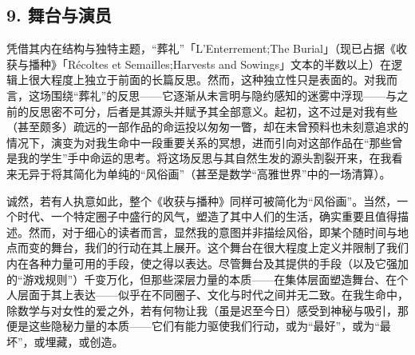 \subsection{9. 舞台与演员}

凭借其内在结构与独特主题，“葬礼”「L'Enterrement;The Burial」（现已占据《收获与播种》「Récoltes et Semailles;Harvests and Sowings」文本的半数以上）在逻辑上很大程度上独立于前面的长篇反思。然而，这种独立性只是表面的。对我而言，这场围绕“葬礼”的反思——它逐渐从未言明与隐约感知的迷雾中浮现——与之前的反思密不可分，后者是其源头并赋予其全部意义。起初，这不过是对我有些（甚至颇多）疏远的一部作品的命运投以匆匆一瞥，却在未曾预料也未刻意追求的情况下，演变为对我生命中一段重要关系的冥想，进而引向对这部作品在“那些曾是我的学生”手中命运的思考。将这场反思与其自然生发的源头割裂开来，在我看来无异于将其简化为单纯的“风俗画”（甚至是数学“高雅世界”中的一场清算）。

诚然，若有人执意如此，整个《收获与播种》同样可被简化为“风俗画”。当然，一个时代、一个特定圈子中盛行的风气，塑造了其中人们的生活，确实重要且值得描述。然而，对于细心的读者而言，显然我的意图并非描绘风俗，即某个随时间与地点而变的舞台，我们的行动在其上展开。这个舞台在很大程度上定义并限制了我们内在各种力量可用的手段，使之得以表达。尽管舞台及其提供的手段（以及它强加的“游戏规则”）千变万化，但那些深层力量的本质——在集体层面塑造舞台、在个人层面于其上表达——似乎在不同圈子、文化与时代之间并无二致。在我生命中，除数学与对女性的爱之外，若有何物让我（虽是迟至今日）感受到神秘与吸引，那便是这些隐秘力量的本质——它们有能力驱使我们行动，或为“最好”，或为“最坏”，或埋藏，或创造。